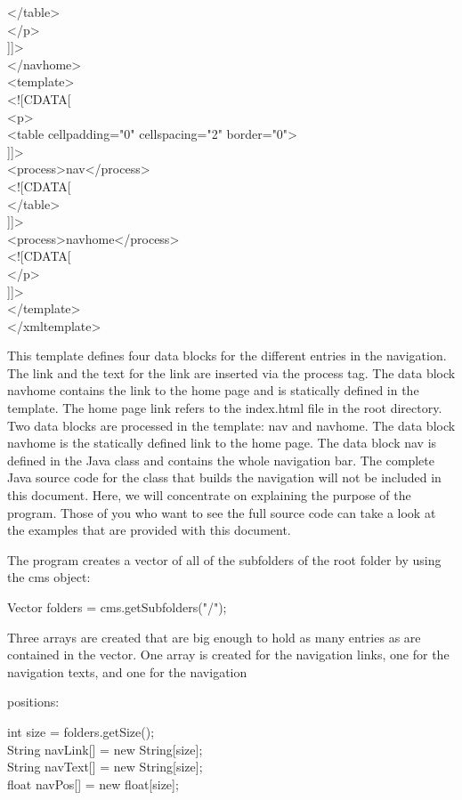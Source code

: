 \begin{xml}
</table>\\
</p>\\
]]>\\
</navhome>\\
<template>\\
<![CDATA[\\
<p>\\
<table cellpadding="0" cellspacing="2" border="0">\\
]]>\\
<process>nav</process>\\
<![CDATA[\\
</table>\\
]]>\\
<process>navhome</process>\\
<![CDATA[\\
</p>\\
]]>\\
</template>\\
</xmltemplate>\\
\end{xml}

This template defines four data blocks for the different entries in the
navigation. The link and the text for the link are inserted via the
process tag. The data block {\name navhome} contains the link to the home
page and is statically defined in the template. The home page link
refers to the {\name index.html} file in the root directory.
Two data blocks are processed in the template: {\name nav} and {\name navhome.} The
data block {\name navhome} is the statically defined link to the home page.
The data block {\name nav} is defined  in the Java class and contains the
whole navigation bar.
The complete Java source code for the class that builds the navigation
will not be included in this document. Here, we will concentrate on
explaining the purpose of the program. Those of you who want to see the
full source code can take a look at the examples that are provided with
this document.

The program creates a vector of all of the subfolders of the root
folder by using the cms object:

Vector folders = {\name cms.getSubfolders("/");}

Three arrays are created that are big enough to hold as many entries as
are contained in the vector. One array is created for the navigation
links, one for the navigation texts, and one for the navigation

positions:
\begin{java}
int size = folders.getSize();\\
String navLink[] = new String[size];\\
String navText[] = new String[size];\\
float navPos[] = new float[size];\\
\end{java}

